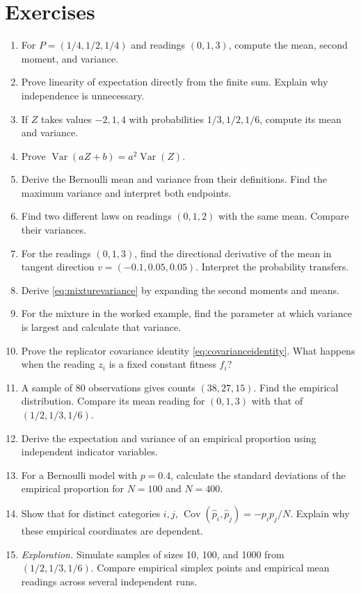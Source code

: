 \documentclass[11pt,oneside,openany]{book}
\theoremstyle{definition}
\theoremstyle{remark}
\newenvironment{exercises}{\begin{enumerate}[label=\thechapter.\arabic*,ref=\thechapter.\arabic*,leftmargin=2.8em,itemsep=6pt]}{\end{enumerate}}
\newcommand{\Var}{\operatorname{Var}}
\newcommand{\Cov}{\operatorname{Cov}}
\numberwithin{equation}{chapter}
\begin{document}
\section{Exercises}
\begin{exercises}
\item For $P=(1/4,1/2,1/4)$ and readings $(0,1,3)$, compute the mean, second moment, and variance.
\item Prove linearity of expectation directly from the finite sum. Explain why independence is unnecessary.
\item If $Z$ takes values $-2,1,4$ with probabilities $1/3,1/2,1/6$, compute its mean and variance.
\item Prove $\Var(aZ+b)=a^2\Var(Z)$.
\item Derive the Bernoulli mean and variance from their definitions. Find the maximum variance and interpret both endpoints.
\item Find two different laws on readings $(0,1,2)$ with the same mean. Compare their variances.
\item For the readings $(0,1,3)$, find the directional derivative of the mean in tangent direction $v=(-0.1,0.05,0.05)$. Interpret the probability transfers.
\item Derive \eqref{eq:mixturevariance} by expanding the second moments and means.
\item For the mixture in the worked example, find the parameter at which variance is largest and calculate that variance.
\item Prove the replicator covariance identity \eqref{eq:covarianceidentity}. What happens when the reading $z_i$ is a fixed constant fitness $f_i$?
\item A sample of 80 observations gives counts $(38,27,15)$. Find the empirical distribution. Compare its mean reading for $(0,1,3)$ with that of $(1/2,1/3,1/6)$.
\item Derive the expectation and variance of an empirical proportion using independent indicator variables.
\item For a Bernoulli model with $p=0.4$, calculate the standard deviations of the empirical proportion for $N=100$ and $N=400$.
\item Show that for distinct categories $i,j$, $\Cov(\widehat p_i,\widehat p_j)=-p_ip_j/N$. Explain why these empirical coordinates are dependent.
\item \emph{Exploration.} Simulate samples of sizes 10, 100, and 1000 from $(1/2,1/3,1/6)$. Compare empirical simplex points and empirical mean readings across several independent runs.

\end{exercises}
\end{document}
